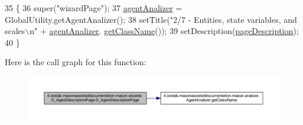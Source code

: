 \begin{DoxyCode}
35                                     \{
36         super(\textcolor{stringliteral}{"wizardPage"});
37         \hyperlink{classit_1_1isislab_1_1masonassisteddocumentation_1_1mason_1_1wizards_1_1_d___agent_description_page_a3551237b74a669c361623caa219af9d7}{agentAnalizer} = GlobalUtility.getAgentAnalizer();
38         setTitle(\textcolor{stringliteral}{"2/7 - Entities, state variables, and scales\(\backslash\)n"} + \hyperlink{classit_1_1isislab_1_1masonassisteddocumentation_1_1mason_1_1wizards_1_1_d___agent_description_page_a3551237b74a669c361623caa219af9d7}{agentAnalizer}.
      \hyperlink{classit_1_1isislab_1_1masonassisteddocumentation_1_1mason_1_1analizer_1_1_agent_analizer_a94492199c5e4873a07a2a46d15617937}{getClassName}());
39         setDescription(\hyperlink{classit_1_1isislab_1_1masonassisteddocumentation_1_1mason_1_1wizards_1_1_d___agent_description_page_a28540e2ea308e26ef8e80ba9d4848443}{pageDescription});
40     \}
\end{DoxyCode}


Here is the call graph for this function\-:
\nopagebreak
\begin{figure}[H]
\begin{center}
\leavevmode
\includegraphics[width=350pt]{classit_1_1isislab_1_1masonassisteddocumentation_1_1mason_1_1wizards_1_1_d___agent_description_page_aee37d48e42e4d6f95404e42ecfd04e6d_cgraph}
\end{center}
\end{figure}




